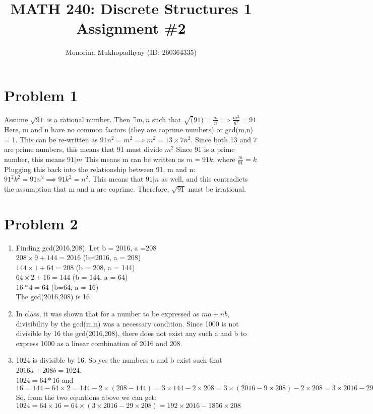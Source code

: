 \documentclass[english]{article}
\title{MATH 240: Discrete Structures 1 Assignment \#2}
\author{Monorina Mukhopadhyay (ID: 260364335)}
\begin{document}
\maketitle
\section*{Problem 1}
Assume $\sqrt{91}$ is a rational number. Then $\exists m, n $ such that $\sqrt(91) = \frac{m}{n} \implies \frac{m^2}{n^2} = 91$ Here, 
m and n have no common factors (they are coprime numbers) or gcd(m,n) = 1.
This can be re-written as $91 n^2 = m^2 \implies m^2 = 13 \times 7 n^2$. Since both 13 and 7 are prime numbers, this means that
91 must divide $m^2$ Since 91 is a prime number, this means $91 | m$ This means m can be written as $m = 91k$, where $\frac{m}{91} = k$
Plugging this back into the relationship between 91, m and n: $91^2 k^2 = 91 n^2 \implies 91 k^2 = n^2 $. This means that $91|n$ as well, and
this contradicts the assumption that m and n are coprime. Therefore, $\sqrt{91}$ must be irrational.  
\section*{Problem 2}
\begin{enumerate} [label=\alph*]
\item Finding gcd(2016,208): Let b = 2016, a =208\\
$208 \times 9 + 144 = 2016$ \qquad (b=2016, a = 208) \\
$144 \times 1 + 64 = 208$ \qquad (b = 208, a = 144) \\
$ 64 \times 2 + 16 = 144$ \qquad (b = 144, a = 64) \\
$16*4 = 64$ \qquad (b=64, a = 16)\\
The gcd(2016,208) is 16
\item In class, it was shown that for a number to be expressed as $ma + nb$, divisibility by the gcd(m,n) was a necessary condition.
Since 1000 is not divisible by 16 the gcd(2016,208), there does not exist any such a and b to express 1000 as a linear combination of 2016 and 208.
\item 1024 is divisible by 16. So yes the numbers a and b exist such that $2016a + 208b = 1024$.\\
$1024 = 64*16$ and $16 = 144 - 64 \times 2 = 144 - 2 \times (208 - 144) = 3 \times 144 - 2 \times 208 = 3 \times (2016 - 9 \times 208) - 2 \times 208 = 3 \times 2016 - 29 \times 208$
So, from the two equations above we can get: $1024 = 64 \times 16 = 64 \times (3 \times 2016 - 29 \times 208) = 192 \times 2016 -  1856 \times 208$
\end{enumerate}
\end{document}
